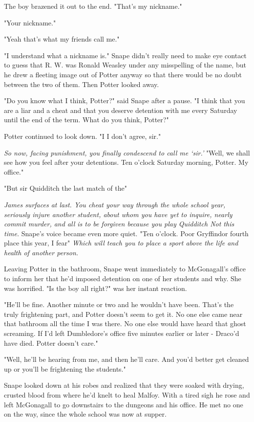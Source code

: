 The boy brazened it out to the end. "That's my nickname."

"Your nickname."

"Yeah{\el} that's what my friends call me."

"I understand what a nickname is." Snape didn't really need to make eye contact to guess that R. W. was Ronald Weasley under any misspelling of the name, but he drew a fleeting image out of Potter anyway so that there would be no doubt between the two of them. Then Potter looked away.

"Do you know what I think, Potter?" said Snape after a pause. "I think that you are a liar and a cheat and that you deserve detention with me every Saturday until the end of the term. What do you think, Potter?"

Potter continued to look down. "I{\el} I don't agree, sir."

\emph{So now, facing punishment, you finally condescend to call me `sir.'} "Well, we shall see how you feel after your detentions. Ten o'clock Saturday morning, Potter. My office."

"But sir{\el} Quidditch{\el} the last match of the{\el}"

\emph{James surfaces at last. You cheat your way through the whole school year, seriously injure another student, about whom you have yet to inquire, nearly commit murder, and all is to be forgiven because you play Quidditch{\el} Not this time.} Snape's voice became even more quiet. "Ten o'clock. Poor Gryffindor{\el} fourth place this year, I fear{\el}" \emph{Which will teach you to place a sport above the life and health of another person.}

Leaving Potter in the bathroom, Snape went immediately to McGonagall's office to inform her that he'd imposed detention on one of her students and why. She was horrified. "Is the boy all right?" was her instant reaction.

"He'll be fine. Another minute or two and he wouldn't have been. That's the truly frightening part, and Potter doesn't seem to get it. No one else came near that bathroom all the time I was there. No one else would have heard that ghost screaming. If I'd left Dumbledore's office five minutes earlier or later - Draco'd have died. Potter doesn't care."

"Well, he'll be hearing from me, and then he'll care. And you'd better get cleaned up or you'll be frightening the students."

Snape looked down at his robes and realized that they were soaked with drying, crusted blood from where he'd knelt to heal Malfoy. With a tired sigh he rose and left McGonagall to go downstairs to the dungeons and his office. He met no one on the way, since the whole school was now at supper.

